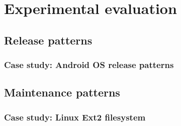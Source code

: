 \chapter{Experimental evaluation}
\section{Release patterns}
\subsection{Case study: Android OS release patterns}
\section{Maintenance patterns}
\subsection{Case study: Linux Ext2 filesystem}
